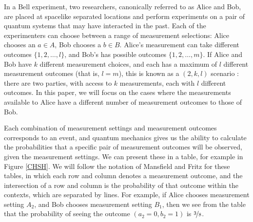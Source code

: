 \documentclass[reprint]{revtex4-1}
\theoremstyle{definition}
\begin{document}
In a Bell experiment, two researchers, canonically referred to as Alice and Bob, are placed at spacelike separated locations and perform experiments on a pair of quantum systems that may have interacted in the past. Each of the experimenters can choose between a range of measurement selections: Alice chooses an $a\in A$, Bob chooses a $b\in B$. Alice's measurement can take different outcomes $\{1,2,\dots,l\}$, and Bob's has possible outcomes $\{1,2,\dots,m\}$. If Alice and Bob have $k$ different measurement choices, and each has a maximum of $l$ different measurement outcomes (that is, $l=m$), this is known as a $(2,k,l)$ scenario \cite{Mans2011,Abra2013}: there are two parties, with access to $k$ measurements, each with $l$ different outcomes. In this paper, we will focus on the cases where the measurements available to Alice have a different number of measurement outcomes to those of Bob.

Each combination of measurement settings and measurement outcomes corresponds to an event, and quantum mechanics gives us the ability to calculate the probabilities that a specific pair of measurement outcomes will be observed, given the measurement settings. We can present these in a table, for example in Figure \ref{CHSH}. We will follow the notation of Mansfield and Fritz for these tables, in which each row and column denotes a measurement outcome, and the intersection of a row and column is the probability of that outcome within the contexts, which are separated by lines.  For example, if Alice chooses measurement setting $A_2$, and Bob chooses measurement setting $B_1$, then we see from the table that the probability of seeing the outcome $(a_2=0, b_2=1)$ is $\nicefrac38$. 
\end{document}
